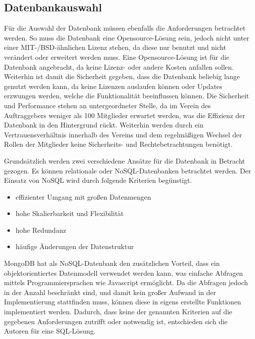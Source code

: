 \subsection{Datenbankauswahl}
\label{datenbankauswahl}
Für die Auswahl der Datenbank müssen ebenfalls die Anforderungen betrachtet werden. So muss die Datenbank eine Opensource-Lösung sein, jedoch nicht unter einer MIT-/BSD-ähnlichen Lizenz stehen, da diese nur benutzt und nicht verändert oder erweitert werden muss. Eine Opensource-Lösung ist für die Datenbank angebracht, da keine Lizenz- oder andere Kosten anfallen sollen. Weiterhin ist damit die Sicherheit gegeben, dass die Datenbank beliebig lange genutzt werden kann, da keine Lizenzen auslaufen können oder Updates erzwungen werden, welche die Funktionalität beeinflussen können. Die Sicherheit und Performance stehen an untergeordneter Stelle, da im Verein des Auftraggebers weniger als 100 Mitglieder erwartet werden, was die Effizienz der Datenbank in den Hintergrund rückt. Weiterhin werden durch ein Vertrauensverhältnis innerhalb des Vereins und dem regelmäßigen Wechsel der Rollen der Mitglieder keine Sicherheits- und Rechtebetrachtungen benötigt.

Grundsätzlich werden zwei verschiedene Ansätze für die Datenbank in Betracht gezogen. Es können relationale oder NoSQL-Datenbanken betrachtet werden. Der Einsatz von NoSQL wird durch folgende Kriterien begünstigt.

\begin{itemize}
	\item effizienter Umgang mit großen Datenmengen
	\item hohe Skalierbarkeit und Flexibilität
	\item hohe Redundanz
	\item häufige Änderungen der Datenstruktur
\end{itemize}

MongoDB hat als NoSQL-Datenbank den zusätzlichen Vorteil, dass ein objektorientiertes Datenmodell verwendet werden kann, was einfache Abfragen mittels Programmiersprachen wie Javascript ermöglicht. Da die Abfragen jedoch in der Anzahl beschränkt sind, und damit kein großer Aufwand in der Implementierung stattfinden muss, können diese in eigens erstellte Funktionen implementiert werden. Dadurch, dass keine der genannten Kriterien auf die gegebenen Anforderungen zutrifft oder notwendig ist, entschieden sich die Autoren für eine SQL-Lösung.

